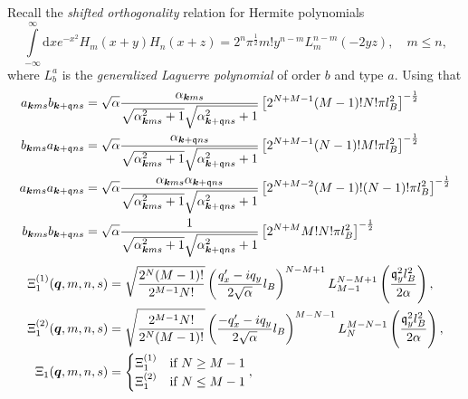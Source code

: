 Recall the \emph{shifted orthogonality} relation for Hermite polynomials~\cite[Eq. (7.377)]{gradshteinTableIntegralsSeries2015}
\begin{equation}
  \label{eq:hermite-shift-ortho}
  \int\limits_{-\infty }^{\infty } \mathrm{d}x
  e^{-x^2} H_m(x+y) H_n(x+z)
  = 2^n \pi^{\frac{1}{2}} m! y^{n-m} L^{n-m}_m(-2yz), \quad m\leq n,
\end{equation}
where \(L^{a}_{b}\) is the \emph{generalized Laguerre polynomial} of order \(b\) and type \(a\).
Using that
\begin{align}
  \label{eq:31}
  a_{\bm{k} m s} b_{\bm{k} +\mathfrak{q} ns}
  &=
    \sqrt{\alpha } \frac{\alpha_{\bm{k} m s}}{\sqrt{\alpha _{\bm{k} m s} ^2 + 1} \sqrt{\alpha _{\bm{k} + \mathfrak{q} ns} ^2  + 1}  }
    \left[
    2^{N+M-1} (M-1)! N! \pi l_{B}^2
    \right  ]^{-\frac{1}{2}}\\
  b_{\bm{k} m s} a_{\bm{k} +\mathfrak{q} ns}
  &=
    \sqrt{\alpha } \frac{\alpha_{\bm{k} + \mathfrak{q} n s}}{\sqrt{\alpha _{\bm{k} m s} ^2 + 1} \sqrt{\alpha _{\bm{k} + \mathfrak{q} ns} ^2  + 1}  }
    \left[
    2^{N+M-1} (N-1)! M! \pi l_{B}^2
    \right  ]^{-\frac{1}{2}}\\
  a_{\bm{k} m s} a_{\bm{k} +\mathfrak{q} ns}
  &=
    \sqrt{\alpha } \frac{\alpha_{\bm{k} m s} \alpha_{\bm{k} + \mathfrak{q} n s}}{
    \sqrt{\alpha _{\bm{k} m s} ^2 + 1} \sqrt{\alpha _{\bm{k} + \mathfrak{q} ns} ^2  + 1}
    }
    \left[
    2^{N+M-2} (M-1)! (N-1)! \pi l_{B}^2
    \right  ]^{-\frac{1}{2}}\\
  b_{\bm{k} m s} b_{\bm{k} +\mathfrak{q} ns}
  &=
    \sqrt{\alpha } \frac{1}{
    \sqrt{\alpha _{\bm{k} m s} ^2 + 1} \sqrt{\alpha _{\bm{k} + \mathfrak{q} ns} ^2  + 1}
    }
    \left[
    2^{N+M} M! N! \pi l_{B}^2
    \right  ]^{-\frac{1}{2}}\\
\end{align}
\begin{align}
  \Xi_1 ^{(1)}(\bm{q}, m, n, s) &= \sqrt{\frac{2^N (M-1)!}{2^{M-1} N!}}
                                   \left( \frac{q'_x - iq_y}{2 \sqrt{\alpha } } l_B \right)^{N-M + 1}
                                   L^{N-M+1}_{M-1} \left( \frac{\mathfrak{q}_y^2 l_B^2}{2 \alpha } \right),\\
  \Xi_1 ^{(2)}(\bm{q}, m, n, s) &= \sqrt{\frac{2^{M-1} N!}{2^N (M-1)!}}
                                   \left( \frac{-q'_x - iq_y}{2 \sqrt{\alpha } } l_B \right)^{M-N - 1}
                                   L^{M - N - 1}_N \left( \frac{\mathfrak{q}_y^2 l_B^2}{2 \alpha } \right),\\
  \Xi_1(\bm{q}, m, n, s) &=
          \begin{cases}
            \Xi _1 ^{(1)} & \text{if } N \geq M-1\\
            \Xi _1 ^{(2)} & \text{if } N \leq M-1
          \end{cases}, \label{eq:42}
\end{align}
